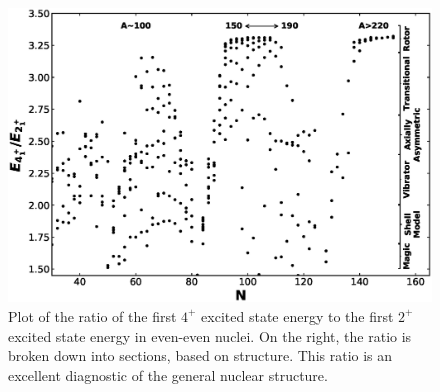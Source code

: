 \begin{figure}
    \centering
    \includegraphics[scale=0.6]{Introduction_Figs/E4E2ratiovsN.eps}
    \caption{Plot of the ratio of the first $4^+$ excited state energy to the first $2^+$ excited state energy in even-even nuclei. On the right, the ratio is broken down into sections, based on structure. This ratio is an excellent diagnostic of the general nuclear structure.}
    \label{fig:E4E2}
\end{figure}